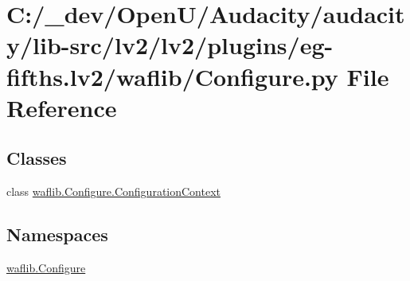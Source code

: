 \hypertarget{lv2_2plugins_2eg-fifths_8lv2_2waflib_2_configure_8py}{}\section{C\+:/\+\_\+dev/\+Open\+U/\+Audacity/audacity/lib-\/src/lv2/lv2/plugins/eg-\/fifths.lv2/waflib/\+Configure.py File Reference}
\label{lv2_2plugins_2eg-fifths_8lv2_2waflib_2_configure_8py}
\subsection*{Classes}
\begin{DoxyCompactItemize}
\item 
class \hyperlink{classwaflib_1_1_configure_1_1_configuration_context}{waflib.\+Configure.\+Configuration\+Context}
\end{DoxyCompactItemize}
\subsection*{Namespaces}
\begin{DoxyCompactItemize}
\item 
 \hyperlink{namespacewaflib_1_1_configure}{waflib.\+Configure}
\end{DoxyCompactItemize}
